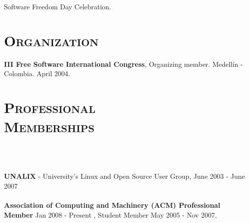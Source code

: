 \begin{resume}
\begin{position}
Software Freedom Day Celebration.
\end{position}
\newline     
\newline
\newline     
\newline
\newline     
\newline          
\newline     
\newline     
\newline     
\newline     
\newline     
\newline     
\newline     
\newline     


\section{\textsc{Organization}}
\employer{\textbf{}}
\dates{}
\textbf{III Free Software International Congress}, Organizing member. Medell\'{i}n - Colombia. April 2004.

\section{\textsc{Professional\\ Memberships}}

\begin{formatb}
  \\
  \body\\
\end{formatb}
\employer{}
   {\textbf{UNALIX} - University's Linux and Open Source User Group,
     June 2003 - June 2007 \\ \\
    \textbf{Association of Computing and Machinery (ACM) Professional 
      Member} Jan 2008 - Present , Student Member May 2005 - Nov 2007,   \\    }




\end{resume}
